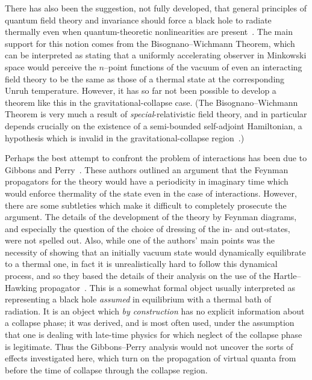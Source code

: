 \documentclass[12pt]{article}
\begin{document}
There has  also been the suggestion, not fully developed, that general
principles of quantum field theory and invariance should force a black hole to
radiate thermally even when quantum-theoretic nonlinearities are
present~\cite{Wald:1994}.  The main support for this notion comes from  the
Bisognano--Wichmann Theorem, which can be interpreted as stating that a
uniformly accelerating observer in Minkowski space would perceive the
$n$--point functions of the vacuum of even an interacting field theory to be
the same as those of a thermal state at the corresponding Unruh temperature.
However, it has so far not been possible to develop a theorem like this in the
gravitational-collapse case.  (The Bisognano--Wichmann Theorem is very much a
result of {\em special}-relativistic field theory, and in particular depends
crucially on the existence of a semi-bounded self-adjoint Hamiltonian, a
hypothesis which is invalid in the gravitational-collapse
region~\cite{Helfer:1996}.)   

Perhaps the best attempt to confront the problem of interactions has been due
to Gibbons and Perry~\cite{GP:1976}.  These authors  outlined an argument that
the Feynman propagators for the theory would have a periodicity in imaginary
time which would enforce thermality of the state even in the case of
interactions.  However, there are some subtleties which make it difficult to
completely prosecute the argument.  The details of the development of the
theory by Feynman diagrams, and especially the question of the choice of
dressing of the in- and out-states, were not spelled out.  Also, while one of
the authors' main points was the necessity of showing that an initially vacuum
state would dynamically equilibrate to a thermal one, in fact it is
unrealistically hard to follow this dynamical process, and so they based the
details of their analysis on the use of the Hartle--Hawking
propagator~\cite{HH:1976}.   This is a somewhat formal object usually
interpreted as representing a black hole {\em assumed} in equilibrium with a
thermal bath of radiation.    It is an object which {\em by construction} has
no explicit information about a collapse phase; it  was derived, and is most
often used, under the assumption that  one is dealing with late-time physics
for which neglect of the collapse  phase is legitimate.  Thus the
Gibbons--Perry analysis would not uncover the sorts of effects investigated
here, which turn on the propagation of virtual quanta from before the time of
collapse through the collapse region.
\end{document}
